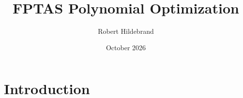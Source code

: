 \documentclass{article}
\title{FPTAS Polynomial Optimization}
\author{Robert Hildebrand}
\date{October 2026}
\begin{document}
\maketitle

\section{Introduction}
\end{document}
